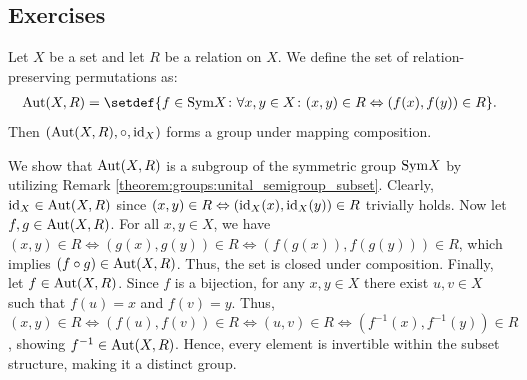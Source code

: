 \subsection{Exercises}

\begin{exercise}
    Let $X$ be a set and let $R$ be a relation on $X$. We define the set of relation-preserving permutations as:
    \begin{align}\autrel{X,R} = \setdef{f \in \symset X \colon \forall x,y \in X \colon (x,y) \in R \Leftrightarrow (f(x), f(y)) \in R}.\end{align}
    Then $(\text{Aut}(X,R), \circ, \text{id}_X)$ forms a group under mapping composition.
\end{exercise}

\begin{solution}
    We show that $\text{Aut}(X,R)$ is a subgroup of the symmetric group $\text{Sym} X$ by utilizing Remark \ref{theorem:groups:unital_semigroup_subset}. Clearly, $\text{id}_X \in \text{Aut}(X,R)$ since $(x,y) \in R \Leftrightarrow (\text{id}_X(x), \text{id}_X(y)) \in R$ trivially holds. 
    Now let $f, g \in \text{Aut}(X,R)$. For all $x,y \in X$, we have $(x,y) \in R \Leftrightarrow (g(x), g(y)) \in R \Leftrightarrow (f(g(x)), f(g(y))) \in R$, which implies $(f \circ g) \in \text{Aut}(X,R)$. Thus, the set is closed under composition. 
    Finally, let $f \in \text{Aut}(X,R)$. Since $f$ is a bijection, for any $x,y \in X$ there exist $u,v \in X$ such that $f(u)=x$ and $f(v)=y$. Thus, $(x,y) \in R \Leftrightarrow (f(u), f(v)) \in R \Leftrightarrow (u,v) \in R \Leftrightarrow (f^{-1}(x), f^{-1}(y)) \in R$, showing $f^{-1} \in \text{Aut}(X,R)$. Hence, every element is invertible within the subset structure, making it a distinct group.
\end{solution}

